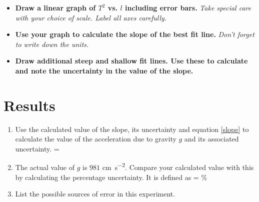     \begin{itemize}

        \item \textbf{Draw a linear graph of $T^2$ vs. $l$ including error bars.} \textit{Take special care with your choice of scale. Label all axes carefully.}

        \item \textbf{Use your graph to calculate the slope of the best fit line.} \textit{Don't forget to write down the units.}

        \item \textbf{Draw additional steep and shallow fit lines. Use these to calculate and note the uncertainty in the value of the slope.}

    \end{itemize}

\section*{Results}

    \begin{enumerate}
        \item Use the calculated value of the slope, its uncertainty and equation \eqref{slope} to calculate the value of the acceleration due to gravity $g$ and its associated uncertainty.
        \beq
             = 
        \eeq

        \item The actual value of $g$ is $981$ \si{\centi\meter \per \second \squared}. Compare your calculated value with this by calculating the percentage uncertainty. It is defined as
        \beq
             =   \%
        \eeq

        \item List the possible sources of error in this experiment.

    \end{enumerate}
